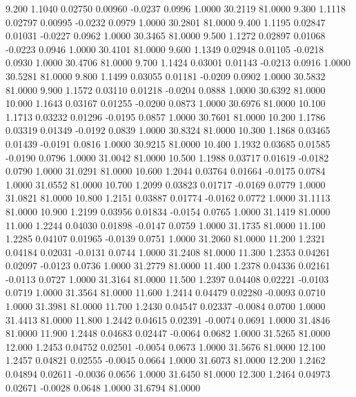    9.200   1.1040   0.02750   0.00960  -0.0237   0.0996   1.0000  30.2119  81.0000
   9.300   1.1118   0.02797   0.00995  -0.0232   0.0979   1.0000  30.2801  81.0000
   9.400   1.1195   0.02847   0.01031  -0.0227   0.0962   1.0000  30.3465  81.0000
   9.500   1.1272   0.02897   0.01068  -0.0223   0.0946   1.0000  30.4101  81.0000
   9.600   1.1349   0.02948   0.01105  -0.0218   0.0930   1.0000  30.4706  81.0000
   9.700   1.1424   0.03001   0.01143  -0.0213   0.0916   1.0000  30.5281  81.0000
   9.800   1.1499   0.03055   0.01181  -0.0209   0.0902   1.0000  30.5832  81.0000
   9.900   1.1572   0.03110   0.01218  -0.0204   0.0888   1.0000  30.6392  81.0000
  10.000   1.1643   0.03167   0.01255  -0.0200   0.0873   1.0000  30.6976  81.0000
  10.100   1.1713   0.03232   0.01296  -0.0195   0.0857   1.0000  30.7601  81.0000
  10.200   1.1786   0.03319   0.01349  -0.0192   0.0839   1.0000  30.8324  81.0000
  10.300   1.1868   0.03465   0.01439  -0.0191   0.0816   1.0000  30.9215  81.0000
  10.400   1.1932   0.03685   0.01585  -0.0190   0.0796   1.0000  31.0042  81.0000
  10.500   1.1988   0.03717   0.01619  -0.0182   0.0790   1.0000  31.0291  81.0000
  10.600   1.2044   0.03764   0.01664  -0.0175   0.0784   1.0000  31.0552  81.0000
  10.700   1.2099   0.03823   0.01717  -0.0169   0.0779   1.0000  31.0821  81.0000
  10.800   1.2151   0.03887   0.01774  -0.0162   0.0772   1.0000  31.1113  81.0000
  10.900   1.2199   0.03956   0.01834  -0.0154   0.0765   1.0000  31.1419  81.0000
  11.000   1.2244   0.04030   0.01898  -0.0147   0.0759   1.0000  31.1735  81.0000
  11.100   1.2285   0.04107   0.01965  -0.0139   0.0751   1.0000  31.2060  81.0000
  11.200   1.2321   0.04184   0.02031  -0.0131   0.0744   1.0000  31.2408  81.0000
  11.300   1.2353   0.04261   0.02097  -0.0123   0.0736   1.0000  31.2779  81.0000
  11.400   1.2378   0.04336   0.02161  -0.0113   0.0727   1.0000  31.3164  81.0000
  11.500   1.2397   0.04408   0.02221  -0.0103   0.0719   1.0000  31.3564  81.0000
  11.600   1.2414   0.04479   0.02280  -0.0093   0.0710   1.0000  31.3981  81.0000
  11.700   1.2430   0.04547   0.02337  -0.0084   0.0700   1.0000  31.4413  81.0000
  11.800   1.2442   0.04615   0.02391  -0.0074   0.0691   1.0000  31.4846  81.0000
  11.900   1.2448   0.04683   0.02447  -0.0064   0.0682   1.0000  31.5265  81.0000
  12.000   1.2453   0.04752   0.02501  -0.0054   0.0673   1.0000  31.5676  81.0000
  12.100   1.2457   0.04821   0.02555  -0.0045   0.0664   1.0000  31.6073  81.0000
  12.200   1.2462   0.04894   0.02611  -0.0036   0.0656   1.0000  31.6450  81.0000
  12.300   1.2464   0.04973   0.02671  -0.0028   0.0648   1.0000  31.6794  81.0000
